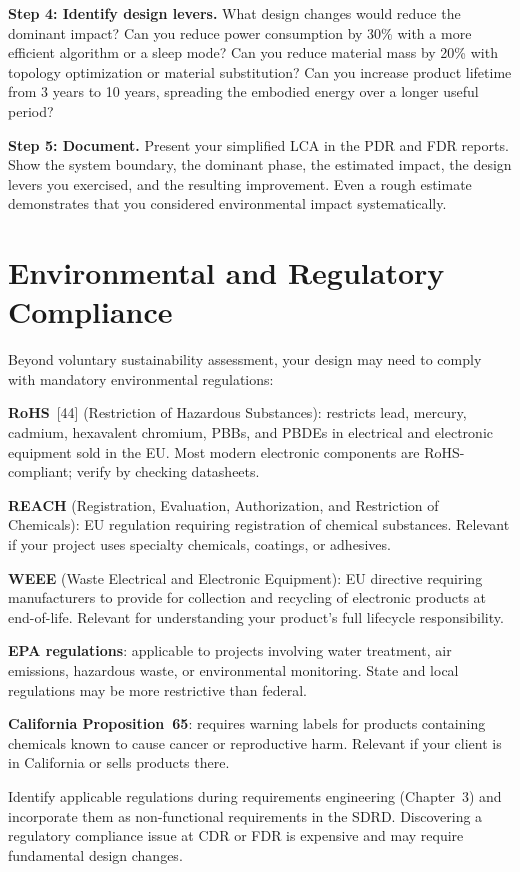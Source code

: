 \textbf{Step 4: Identify design levers.} What design changes would reduce the dominant impact? Can you reduce power consumption by 30\% with a more efficient algorithm or a sleep mode? Can you reduce material mass by 20\% with topology optimization or material substitution? Can you increase product lifetime from 3 years to 10 years, spreading the embodied energy over a longer useful period?

\textbf{Step 5: Document.} Present your simplified LCA in the PDR and FDR reports. Show the system boundary, the dominant phase, the estimated impact, the design levers you exercised, and the resulting improvement. Even a rough estimate demonstrates that you considered environmental impact systematically.

\section{Environmental and Regulatory Compliance}
Beyond voluntary sustainability assessment, your design may need to comply with mandatory environmental regulations:

\textbf{RoHS}~[44] (Restriction of Hazardous Substances): restricts lead, mercury, cadmium, hexavalent chromium, PBBs, and PBDEs in electrical and electronic equipment sold in the EU. Most modern electronic components are RoHS-compliant; verify by checking datasheets.

\textbf{REACH} (Registration, Evaluation, Authorization, and Restriction of Chemicals): EU regulation requiring registration of chemical substances. Relevant if your project uses specialty chemicals, coatings, or adhesives.

\textbf{WEEE} (Waste Electrical and Electronic Equipment): EU directive requiring manufacturers to provide for collection and recycling of electronic products at end-of-life. Relevant for understanding your product's full lifecycle responsibility.

\textbf{EPA regulations}: applicable to projects involving water treatment, air emissions, hazardous waste, or environmental monitoring. State and local regulations may be more restrictive than federal.

\textbf{California Proposition~65}: requires warning labels for products containing chemicals known to cause cancer or reproductive harm. Relevant if your client is in California or sells products there.

Identify applicable regulations during requirements engineering (Chapter~3) and incorporate them as non-functional requirements in the SDRD. Discovering a regulatory compliance issue at CDR or FDR is expensive and may require fundamental design changes.

